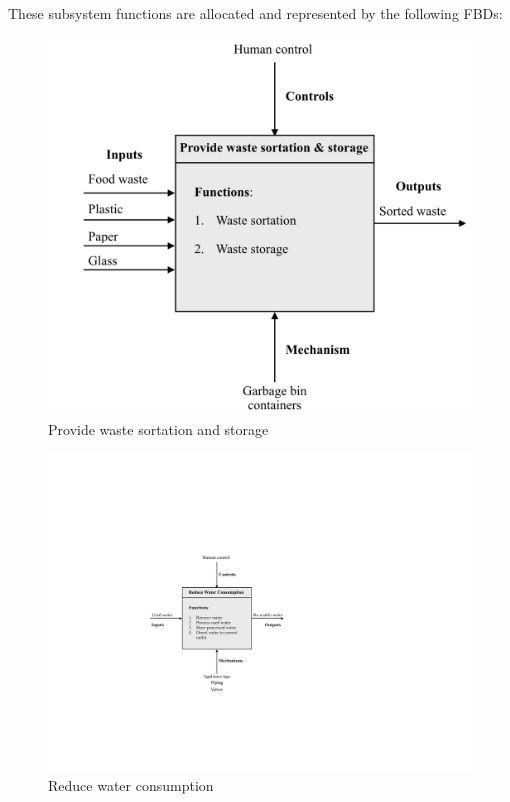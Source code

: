\documentclass[a4paper,11pt,fleqn]{report}
\begin{document}
These subsystem functions are allocated and represented by the following \ac{FBD}s:\\ 
%
\begin{figure}[h!]
\begin{center}
\includegraphics[scale = 0.4]{Function1.pdf}
\caption{Provide waste sortation and storage}
\label{fig: Function1}
\end{center}
\end{figure}
%
\begin{figure}[h!]
\begin{center}
\includegraphics[scale = 0.8]{Function2.pdf}
\caption{Reduce water consumption}
\label{fig: Function2}
\end{center}
\end{figure}
\end{document}
